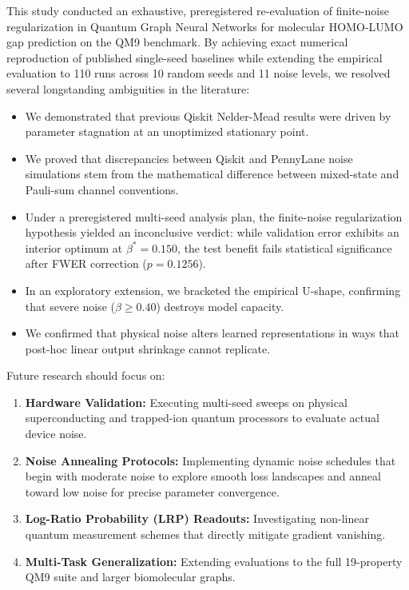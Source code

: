 \documentclass[sn-apacite,Numbered]{sn-jnl}
\begin{document}
This study conducted an exhaustive, preregistered re-evaluation of finite-noise regularization in Quantum Graph Neural Networks for molecular HOMO-LUMO gap prediction on the QM9 benchmark. By achieving exact numerical reproduction of published single-seed baselines while extending the empirical evaluation to 110 runs across 10 random seeds and 11 noise levels, we resolved several longstanding ambiguities in the literature:
\begin{itemize}
    \item We demonstrated that previous Qiskit Nelder-Mead results were driven by parameter stagnation at an unoptimized stationary point.
    \item We proved that discrepancies between Qiskit and PennyLane noise simulations stem from the mathematical difference between mixed-state and Pauli-sum channel conventions.
    \item Under a preregistered multi-seed analysis plan, the finite-noise regularization hypothesis yielded an inconclusive verdict: while validation error exhibits an interior optimum at $\beta^* = 0.150$, the test benefit fails statistical significance after FWER correction ($p = 0.1256$).
    \item In an exploratory extension, we bracketed the empirical U-shape, confirming that severe noise ($\beta \ge 0.40$) destroys model capacity.
    \item We confirmed that physical noise alters learned representations in ways that post-hoc linear output shrinkage cannot replicate.
\end{itemize}

Future research should focus on:
\begin{enumerate}
    \item \textbf{Hardware Validation:} Executing multi-seed sweeps on physical superconducting and trapped-ion quantum processors to evaluate actual device noise.
    \item \textbf{Noise Annealing Protocols:} Implementing dynamic noise schedules that begin with moderate noise to explore smooth loss landscapes and anneal toward low noise for precise parameter convergence.
    \item \textbf{Log-Ratio Probability (LRP) Readouts:} Investigating non-linear quantum measurement schemes that directly mitigate gradient vanishing.
    \item \textbf{Multi-Task Generalization:} Extending evaluations to the full 19-property QM9 suite and larger biomolecular graphs.
\end{enumerate}
\end{document}
